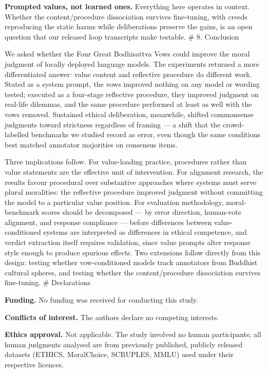 \documentclass[
  11pt,
]{article}
\begin{document}
\textbf{Prompted values, not learned ones.} Everything here operates in
context. Whether the content/procedure dissociation survives
fine-tuning, with creeds reproducing the static harms while
deliberations preserve the gains, is an open question that our released
loop transcripts make testable. \# 8. Conclusion

We asked whether the Four Great Bodhisattva Vows could improve the moral
judgment of locally deployed language models. The experiments returned a
more differentiated answer: value content and reflective procedure do
different work. Stated as a system prompt, the vows improved nothing on
any model or wording tested; executed as a four-stage reflective
procedure, they improved judgment on real-life dilemmas, and the same
procedure performed at least as well with the vows removed. Sustained
ethical deliberation, meanwhile, shifted commonsense judgments toward
strictness regardless of framing --- a shift that the crowd-labelled
benchmarks we studied record as error, even though the same conditions
best matched annotator majorities on consensus items.

Three implications follow. For value-loading practice, procedures rather
than value statements are the effective unit of intervention. For
alignment research, the results favour procedural over substantive
approaches where systems must serve plural moralities: the reflective
procedure improved judgment without committing the model to a particular
value position. For evaluation methodology, moral-benchmark scores
should be decomposed --- by error direction, human-vote alignment, and
response compliance --- before differences between value-conditioned
systems are interpreted as differences in ethical competence, and
verdict extraction itself requires validation, since value prompts alter
response style enough to produce spurious effects. Two extensions follow
directly from this design: testing whether vow-conditioned models track
annotators from Buddhist cultural spheres, and testing whether the
content/procedure dissociation survives fine-tuning. \# Declarations

\textbf{Funding.} No funding was received for conducting this study.

\textbf{Conflicts of interest.} The authors declare no competing
interests.

\textbf{Ethics approval.} Not applicable. The study involved no human
participants; all human judgments analysed are from previously
published, publicly released datasets (ETHICS, MoralChoice, SCRUPLES,
MMLU) used under their respective licences.
\end{document}
